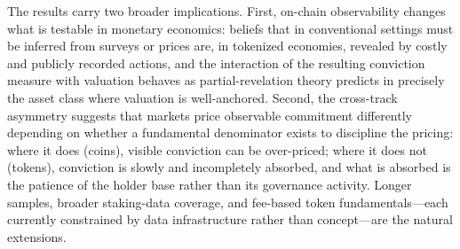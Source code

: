\documentclass[12pt]{article}
\begin{document}
The results carry two broader implications. First, on-chain observability changes what
is testable in monetary economics: beliefs that in conventional settings must be
inferred from surveys or prices are, in tokenized economies, revealed by costly and
publicly recorded actions, and the interaction of the resulting conviction measure
with valuation behaves as partial-revelation theory predicts in precisely the asset
class where valuation is well-anchored. Second, the cross-track asymmetry suggests
that markets price observable commitment differently depending on whether a
fundamental denominator exists to discipline the pricing: where it does (coins),
visible conviction can be over-priced; where it does not (tokens), conviction is
slowly and incompletely absorbed, and what is absorbed is the patience of the holder
base rather than its governance activity. Longer samples, broader staking-data
coverage, and fee-based token fundamentals---each currently constrained by data
infrastructure rather than concept---are the natural extensions.


\clearpage
\processdelayedfloats
\clearpage
\end{document}
